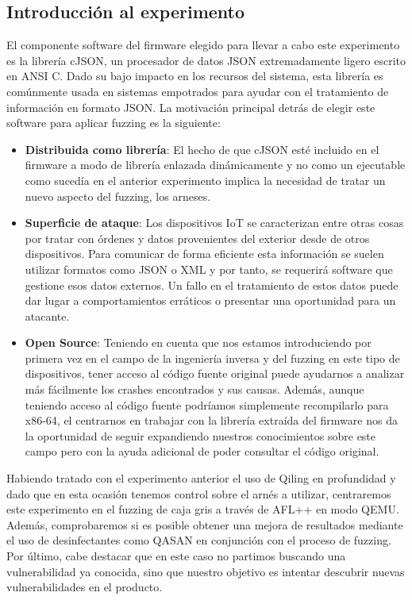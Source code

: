 \subsection{Introducción al experimento}
El componente software del firmware elegido para llevar a cabo este experimento es la librería cJSON\cite{cJSON}, un procesador de datos JSON extremadamente 
ligero escrito en ANSI C. Dado su bajo impacto en los recursos del sistema, esta librería es comúnmente usada en sistemas empotrados para
ayudar con el tratamiento de información en formato JSON. La motivación principal detrás de elegir este software para aplicar fuzzing es
la siguiente:
\begin{itemize}
    \item \textbf{Distribuida como librería}: El hecho de que cJSON esté incluido en el firmware a modo de librería enlazada dinámicamente y no como un ejecutable
    como sucedía en el anterior experimento implica la necesidad de tratar un nuevo aspecto del fuzzing, los arneses.
    \item \textbf{Superficie de ataque}: Los dispositivos IoT se caracterizan entre otras cosas por tratar con órdenes y datos provenientes del exterior
    desde de otros dispositivos. Para comunicar de forma eficiente esta información se suelen utilizar formatos como JSON o XML y por tanto, se 
    requerirá software que gestione esos datos externos. Un fallo en el tratamiento de estos datos puede dar lugar a comportamientos erráticos o 
    presentar una oportunidad para un atacante.
    \item \textbf{Open Source}: Teniendo en cuenta que nos estamos introduciendo por primera vez en el campo de la ingeniería inversa y del fuzzing en este tipo de 
    dispositivos, tener acceso al código fuente original puede ayudarnos a analizar más fácilmente los crashes encontrados y sus causas. Además, 
    aunque teniendo acceso al código fuente podríamos simplemente recompilarlo para x86-64, el centrarnos en trabajar con la librería extraída del firmware 
    nos da la oportunidad de seguir expandiendo nuestros conocimientos sobre este campo pero con la ayuda adicional de poder consultar el código original.
\end{itemize}

Habiendo tratado con el experimento anterior el uso de Qiling en profundidad y dado que en esta ocasión tenemos control sobre el arnés a utilizar, centraremos
este experimento en el fuzzing de caja gris a través de AFL++ en modo QEMU. Además, comprobaremos si es posible obtener una mejora de resultados mediante 
el uso de desinfectantes como QASAN en conjunción con el proceso de fuzzing. Por último, cabe destacar que en este caso no partimos buscando una vulnerabilidad
ya conocida, sino que nuestro objetivo es intentar descubrir nuevas vulnerabilidades en el producto.

